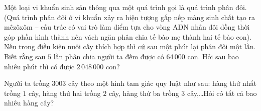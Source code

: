 \begin{bt}%
    Một loại vi khuẩn sinh sản thông qua một quá trình gọi là quá trình phân đôi. (Quá trình phân đôi ở vi khuẩn xảy ra hiện tượng gấp nếp màng sinh chất tạo ra mêzôxôm – cấu trúc có vai trò làm điểm tựa cho vòng ADN nhân đôi đồng thời góp phần hình thành nên vách ngăn phân chia tế bào mẹ thành hai tế bào con). Nếu trong điều kiện nuôi cấy thích hợp thì cứ sau một phút lại phân đôi một lần. Biết rằng sau $5$ lần phân chia người ta đếm được có $64\,000$ con. Hỏi sau bao nhiêu phút thì có được $2\,048\,000$ con?
\end{bt}

\begin{bt}%
Người ta trồng $3003$ cây theo một hình tam giác quy luật như sau: hàng thứ nhất trồng $1$ cây, hàng thứ hai trồng $2$ cây, hàng thứ ba trồng $3$ cây,\ldots Hỏi có tất cả bao nhiêu hàng cây?
\end{bt}

